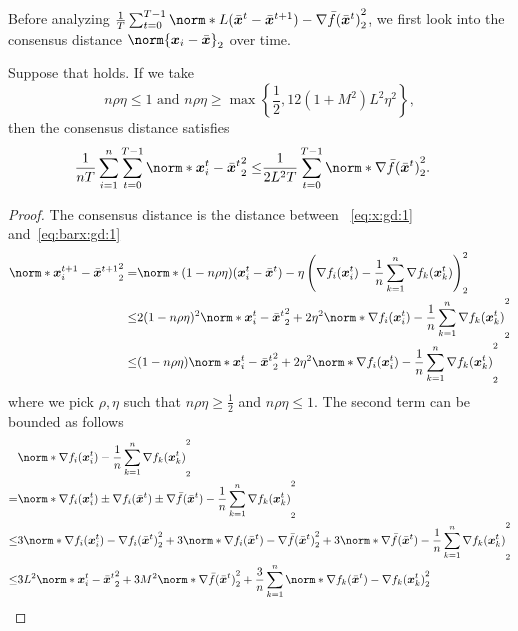 \documentclass{article}
\begin{document}
Before analyzing $\frac{1}{T} \sum_{t=0}^{T-1} \norm*{L(\bar{\xx}^{t}-\bar{\xx}^{t+1}) - \nabla \bar{f}(\bar{\xx}^{t})}_2^2$, we first look into the consensus distance $\norm{\xx_i - \bar{\xx} }_2$ over time.
\begin{lemma}\label{lemma:consensus-distance:1}
  Suppose that  holds.
  If we take $$n\rho\eta\le 1 \text{ and } n\rho\eta\ge\max\left\{\frac{1}{2}, 12(1+M^2)L^2\eta^2\right\},$$
  then the consensus distance satisfies
  \begin{align*}
    \frac{1}{nT}\sum_{i=1}^n\sum_{t=0}^{T-1} \norm*{\xx_i^{t} - \bar{\xx}^{t}}_2^2
    \le& \frac{1}{2L^2T} \sum_{t=0}^{T-1} \norm*{\nabla \bar{f}(\bar{\xx}^t) }_2^2.
  \end{align*}
\end{lemma}
\begin{proof}
  The consensus distance is the distance between ~\eqref{eq:x:gd:1} and~\eqref{eq:barx:gd:1}
  \begin{align*}
    \norm*{\xx_i^{t+1} - \bar{\xx}^{t+1}}_2^2
    =& \norm*{(1-n\rho\eta)(\xx_i^{t} - \bar{\xx}^{t})-\eta\left(\nabla f_i(\xx_i^t) - \frac{1}{n}\sum_{k=1}^n\nabla f_k(\xx_k^t)\right) }_2^2 \\
    \le&2(1-n\rho\eta)^2 \norm*{\xx_i^{t} - \bar{\xx}^{t}}_2^2
    + 2\eta^2\norm*{\nabla f_i(\xx_i^t) - \frac{1}{n}\sum_{k=1}^n\nabla f_k(\xx_k^t)}_2^2 \\
    \le&(1-n\rho\eta) \norm*{\xx_i^{t} - \bar{\xx}^{t}}_2^2
    + 2\eta^2\norm*{\nabla f_i(\xx_i^t) - \frac{1}{n}\sum_{k=1}^n\nabla f_k(\xx_k^t)}_2^2
  \end{align*}
  where we pick $\rho,\eta$ such that $n\rho\eta \ge \frac{1}{2}$ and $n\rho\eta\le 1$. The second term can be bounded as follows 
  \begin{align*}
    &\norm*{\nabla f_i(\xx_i^t) - \frac{1}{n}\sum_{k=1}^n\nabla f_k(\xx_k^t)}_2^2\\
    =& \norm*{\nabla f_i(\xx_i^t) \pm \nabla f_i(\bar{\xx}^t) \pm \nabla \bar{f}(\bar{\xx}^t) - \frac{1}{n}\sum_{k=1}^n\nabla f_k(\xx_k^t)}_2^2 \\
    \le& 3 \norm*{\nabla f_i(\xx_i^t) - \nabla f_i(\bar{\xx}^t)}_2^2 + 3 \norm*{\nabla f_i(\bar{\xx}^t) - \nabla \bar{f}(\bar{\xx}^t)}_2^2 + 3 \norm*{\nabla \bar{f}(\bar{\xx}^t) - \frac{1}{n}\sum_{k=1}^n\nabla f_k(\xx_k^t)}_2^2 \\
    \le& 3 L^2 \norm*{\xx_i^t - \bar{\xx}^t}_2^2 + 3 M^2 \norm*{ \nabla \bar{f}(\bar{\xx}^t) }_2^2 + \frac{3}{n} \sum_{k=1}^n \norm*{\nabla f_k(\bar{\xx}^t) - \nabla f_k(\xx_k^t)}_2^2 \\

\end{align*}
\end{proof}
\end{document}
